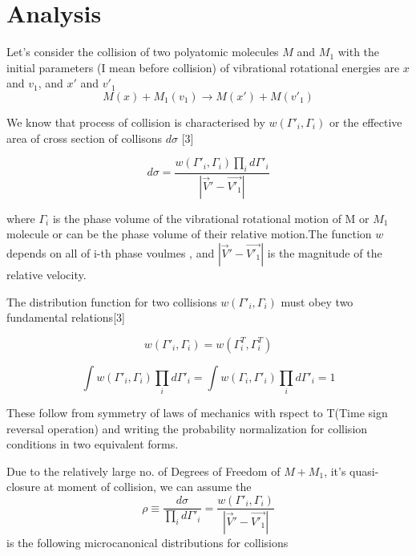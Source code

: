 \documentclass{article}
\begin{document}
\section{\Large Analysis}

Let's consider the collision of two polyatomic molecules $M$ and $M_1$ with the initial parameters (I mean before collision) of vibrational rotational energies are $x$ and $v_1$, and $x'$ and $v'_1$
\begin{equation}
    M(x) + M_1(v_1) \rightarrow M(x') + M(v'_1)
    \label{1}
\end{equation}




We know that process of collision is characterised by $w(\Gamma'_i, \Gamma_i)$ or the effective area of cross section of collisons $d\sigma$ [3]

\begin{equation}
    d\sigma = \frac{w (\Gamma'_i, \Gamma_i )\prod_i d\Gamma'_i}{| \Vec{V}'-\Vec{V'_1}|}
    \label{2}
\end{equation}

where $\Gamma_i$ is the phase volume of the vibrational rotational motion of M or $M_1$ molecule or can be the phase volume of their relative motion.The function $w$ depends on all of i-th phase voulmes , and $| \Vec{V}'-\Vec{V'_1}|$  is the magnitude of the relative velocity.


The distribution function for two collisions 
$w(\Gamma'_i, \Gamma_i)$ must obey two fundamental relations[3]

  \begin{equation}
      w(\Gamma'_i, \Gamma_i)=w(\Gamma^T_i, \Gamma^T_i)
      \label{4}
  \end{equation}

    \begin{equation}
        \int w (\Gamma'_i, \Gamma_i )\prod_i d\Gamma'_i=\int w (\Gamma_i, \Gamma'_i )\prod_i d\Gamma'_i=1
        \label{5}
    \end{equation}
    
    


These follow from symmetry of laws of mechanics with rspect to T(Time sign reversal operation) and writing the probability normalization for collision conditions in two equivalent forms.




Due to the relatively large no. of Degrees of Freedom of $M+M_1$, it's quasi-closure at moment of collision, we can assume the 
$$ \rho\equiv \frac{d\sigma}{\prod_i d\Gamma'_i}=\frac{w(\Gamma'_i, \Gamma_i)}{| \Vec{V}'-\Vec{V'_1}|}$$ is the following microcanonical distributions for collisions
\end{document}
